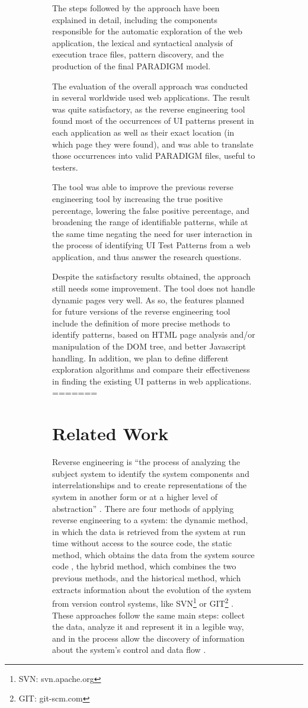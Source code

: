 \documentclass[conference]{IEEEtran}
\begin{document}
\begin{enumerate}
\begin{figure}[!htb]
\begin{itemize}
\begin{figure}[!htb]
\begin{itemize}
The steps followed by the approach have been explained in detail, including the components responsible for the automatic exploration of the web application, the lexical and syntactical analysis of execution trace files, pattern discovery, and the production of the final PARADIGM model.

The evaluation of the overall approach was conducted in several worldwide used web applications. The result was quite satisfactory, as the reverse engineering tool found most of the occurrences of UI patterns present in each application as well as their exact location (in which page they were found), and was able to translate those occurrences into valid PARADIGM files, useful to testers. 

The tool was able to improve the previous reverse engineering tool by increasing the true positive percentage, lowering the false positive percentage, and broadening the range of identifiable patterns, while at the same time negating the need for user interaction in the process of identifying UI Test Patterns from a web application, and thus answer the research questions.

Despite the satisfactory results obtained, the approach still needs some improvement. The tool does not handle dynamic pages very well. As so, the features planned for future versions of the reverse engineering tool include the definition of more precise methods to identify patterns, based on HTML page analysis and/or manipulation of the DOM tree, and better Javascript handling. In addition, we plan to define different exploration algorithms and compare their effectiveness in finding the existing UI patterns in web applications. 
=======
\section{Related Work}\label{sec:sota}

Reverse engineering is ``the process of analyzing the subject system to identify the system components and interrelationships and to create representations of the system in another form or at a higher level of abstraction'' \cite{chikofsky1990reverse}. There are four methods of applying reverse engineering to a system: the dynamic method, in which the data is retrieved from the system at run time without access to the source code, the static method, which obtains the data from the system source code \cite{systa1999dynamic}, the hybrid method, which combines the two previous methods, and the historical method, which extracts information about the evolution of the system
from version control systems, like SVN\footnote{SVN: svn.apache.org} or GIT\footnote{GIT: git-scm.com} \cite{canfora2011achievements}. These approaches follow the same main steps: collect the data, analyze it and represent it in a legible way, and in the process allow the discovery of information about the system's control and data flow \cite{pacione2003comparative}.


\end{itemize}
\end{figure}
\end{itemize}
\end{figure}
\end{enumerate}
\end{document}

